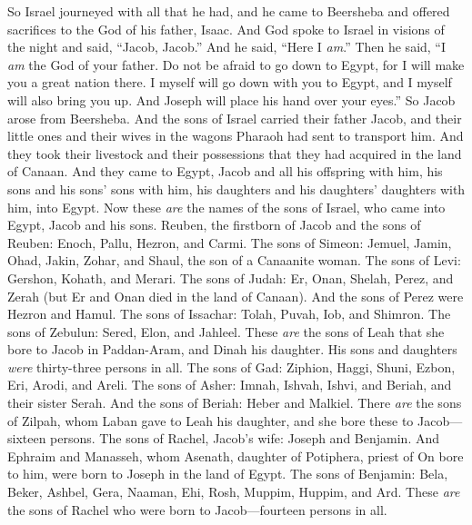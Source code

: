 \begin{biblechapter} %
 So Israel journeyed with all that he had, and he came to Beersheba and offered sacrifices to the God of his father, Isaac.
\verse And God spoke to Israel in visions of the night and said, “Jacob, Jacob.” And he said, “Here I \textit{am}.”
\verse Then he said, “I \textit{am} the God of your father. Do not be afraid to go down to Egypt, for I will make you a great nation there.
\verse I myself will go down with you to Egypt, and I myself will also bring you up. And Joseph will place his hand over your eyes.”
\verse So Jacob arose from Beersheba. And the sons of Israel carried their father Jacob, and their little ones and their wives in the wagons Pharaoh had sent to transport him.
\verse And they took their livestock and their possessions that they had acquired in the land of Canaan. And they came to Egypt, Jacob and all his offspring with him,
\verse his sons and his sons’ sons with him, his daughters and his daughters’ daughters with him, into Egypt.
\verse Now these \textit{are} the names of the sons of Israel, who came into Egypt, Jacob and his sons. Reuben, the firstborn of Jacob
\verse and the sons of Reuben: Enoch, Pallu, Hezron, and Carmi.
\verse The sons of Simeon: Jemuel, Jamin, Ohad, Jakin, Zohar, and Shaul, the son of a Canaanite woman.
\verse The sons of Levi: Gershon, Kohath, and Merari.
\verse The sons of Judah: Er, Onan, Shelah, Perez, and Zerah (but Er and Onan died in the land of Canaan). And the sons of Perez were Hezron and Hamul.
\verse The sons of Issachar: Tolah, Puvah, Iob, and Shimron.
\verse The sons of Zebulun: Sered, Elon, and Jahleel.
\verse These \textit{are} the sons of Leah that she bore to Jacob in Paddan-Aram, and Dinah his daughter. His sons and daughters \textit{were} thirty-three persons in all.
\verse The sons of Gad: Ziphion, Haggi, Shuni, Ezbon, Eri, Arodi, and Areli.
\verse The sons of Asher: Imnah, Ishvah, Ishvi, and Beriah, and their sister Serah. And the sons of Beriah: Heber and Malkiel.
\verse There \textit{are} the sons of Zilpah, whom Laban gave to Leah his daughter, and she bore these to Jacob—sixteen persons.
\verse The sons of Rachel, Jacob’s wife: Joseph and Benjamin.
\verse And Ephraim and Manasseh, whom Asenath, daughter of Potiphera, priest of On bore to him, were born to Joseph in the land of Egypt.
\verse The sons of Benjamin: Bela, Beker, Ashbel, Gera, Naaman, Ehi, Rosh, Muppim, Huppim, and Ard.
\verse These \textit{are} the sons of Rachel who were born to Jacob—fourteen persons in all.

\end{biblechapter}
